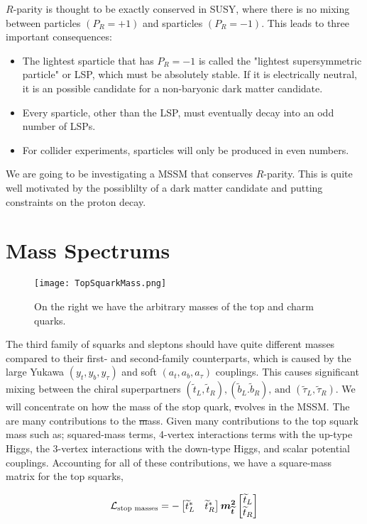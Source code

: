 $R$-parity is thought to be exactly conserved in SUSY, where there is no mixing between particles $(P_R=+1)$ and sparticles $(P_R=-1)$. This leads to three important consequences:

 \begin{itemize}
	 \item The lightest sparticle that has $P_R=-1$ is called the "lightest supersymmetric particle" or LSP, which must be absolutely stable. If it is electrically neutral, it is an possible candidate for a non-baryonic dark matter candidate.
	 \item Every sparticle, other than the LSP, must eventually decay into an odd number of LSPs.
	 \item For collider experiments, sparticles will only be produced in even numbers.
 \end{itemize}
 
 We are going to be investigating a MSSM that conserves $R$-parity. This is quite well motivated by the possiblilty of a dark matter candidate and putting constraints on the proton decay. 

\section{Mass Spectrums}

\begin{figure}
\centering
	\texttt{[image: TopSquarkMass.png]}
 	\caption{On the right we have the arbitrary masses of the top and charm quarks.}
 	\label{StopMass} 
\end{figure}

The third family of squarks and sleptons should have quite different masses compared to their first- and second-family counterparts, which is caused by the large Yukawa $(y_t, y_b, y_\tau)$ and soft $(a_t, a_b, a_\tau)$ couplings. This causes significant mixing between the chiral superpartners $(\widetilde{t}_L, \widetilde{t}_R), (\widetilde{b}_L. \widetilde{b}_R)\text{, and } (\widetilde{\tau}_L, \widetilde{\tau}_R)$. We will concentrate on how the mass of the stop quark, \st evolves in the MSSM. The are many contributions to the \st mass. Given many contributions to the top squark mass such as; squared-mass terms, 4-vertex interactions terms with the up-type Higgs, the 3-vertex interactions with the down-type Higgs, and scalar potential couplings. Accounting for all of these contributions, we have a square-mass matrix for the top squarks, 

\begin{equation}
\mathcal{L}_{\text{stop masses}}=-
\begin{bmatrix}
\widetilde{t}^*_L & \widetilde{t}^*_R \\
\end{bmatrix}
\boldsymbol{m_{\widetilde{t}}^2}
\begin{bmatrix}
\widetilde{t}_L \\
\widetilde{t}_R \\
\end{bmatrix}
\end{equation}

